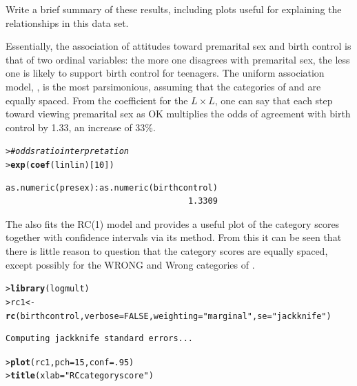 \documentclass[10pt]{report}\usepackage[]{graphicx}\usepackage[]{color}
\makeatletter
\newcommand{\hlnum}[1]{\textcolor[rgb]{0.686,0.059,0.569}{#1}}%
\newcommand{\hlstr}[1]{\textcolor[rgb]{0.192,0.494,0.8}{#1}}%
\newcommand{\hlcom}[1]{\textcolor[rgb]{0.678,0.584,0.686}{\textit{#1}}}%
\newcommand{\hlstd}[1]{\textcolor[rgb]{0.345,0.345,0.345}{#1}}%
\newcommand{\hlkwb}[1]{\textcolor[rgb]{0.69,0.353,0.396}{#1}}%
\newcommand{\hlkwc}[1]{\textcolor[rgb]{0.333,0.667,0.333}{#1}}%
\newcommand{\hlkwd}[1]{\textcolor[rgb]{0.737,0.353,0.396}{\textbf{#1}}}%
\newenvironment{kframe}{%
 \def\at@end@of@kframe{}%
 \ifinner\ifhmode%
  \def\at@end@of@kframe{\end{minipage}}%
  \begin{minipage}{\columnwidth}%
 \fi\fi%
 \def\FrameCommand##1{\hskip\@totalleftmargin \hskip-\fboxsep
 \colorbox{shadecolor}{##1}\hskip-\fboxsep
     \hskip-\linewidth \hskip-\@totalleftmargin \hskip\columnwidth}%
 \MakeFramed {\advance\hsize-\width
   \@totalleftmargin\z@ \linewidth\hsize
   \@setminipage}}%
 {\par\unskip\endMakeFramed%
 \at@end@of@kframe}
\newenvironment{knitrout}{}{} %
\renewenvironment{knitrout}{\small\renewcommand{\baselinestretch}{.85}}{} %
\makeatother
\begin{document}
\begin{Exercises}
\begin{enumerate*}
    \item Write a brief summary of these results, including plots useful
    for explaining the relationships in this data set.
    \begin{ans}
    Essentially, the association of attitudes toward premarital sex and
    birth control is that of two ordinal variables: the more one disagrees
    with premarital sex, the less one is likely to support birth control
    for teenagers.  The uniform association model, , is
    the most parsimonious, assuming that the categories of 
    and  are equally spaced.
    From the coefficient for the $L \times L$, one can say that each
    step toward viewing premarital sex as OK multiplies the odds of
    agreement with birth control by 1.33, an increase of 33\%.
\begin{knitrout}\footnotesize
{}\color{fgcolor}\begin{kframe}
\begin{alltt}
\hlstd{> }\hlcom{# odds ratio interpretation}
\hlstd{> }\hlkwd{exp}\hlstd{(}\hlkwd{coef}\hlstd{(linlin)[}\hlnum{10}\hlstd{])}
\end{alltt}
\begin{verbatim}
as.numeric(presex):as.numeric(birthcontrol) 
                                     1.3309 
\end{verbatim}
\end{kframe}
\end{knitrout}
    The  also fits the RC(1) model and provides a useful plot of the category
    scores together with confidence intervals via its  method. From this it can be
    seen that there is little reason to question that the category scores are equally spaced,
    except possibly for the WRONG and Wrong categories of .
\begin{knitrout}\footnotesize
{}\color{fgcolor}\begin{kframe}
\begin{alltt}
\hlstd{> }\hlkwd{library}\hlstd{(logmult)}
\hlstd{> }\hlstd{rc1} \hlkwb{<-} \hlkwd{rc}\hlstd{(birthcontrol,} \hlkwc{verbose}\hlstd{=}\hlnum{FALSE}\hlstd{,} \hlkwc{weighting}\hlstd{=}\hlstr{"marginal"}\hlstd{,} \hlkwc{se}\hlstd{=}\hlstr{"jackknife"}\hlstd{)}
\end{alltt}
\begin{verbatim}
Computing jackknife standard errors...
\end{verbatim}
\begin{alltt}
\hlstd{> }\hlkwd{plot}\hlstd{(rc1,} \hlkwc{pch}\hlstd{=}\hlnum{15}\hlstd{,} \hlkwc{conf}\hlstd{=}\hlnum{.95}\hlstd{)}
\hlstd{> }\hlkwd{title}\hlstd{(}\hlkwc{xlab}\hlstd{=}\hlstr{"RC category score"}\hlstd{)}
\end{alltt}
\end{kframe}


\end{knitrout}
\end{ans}
\end{enumerate*}
\end{Exercises}
\end{document}
